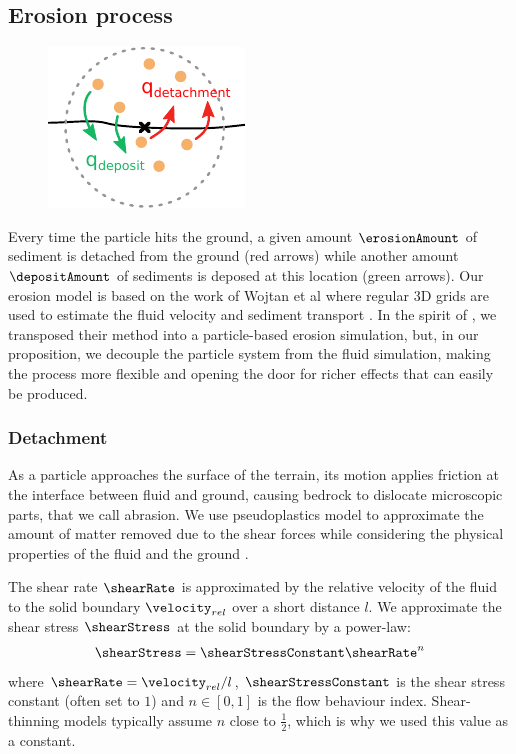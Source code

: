 \subsection{Erosion process}
\begin{figure}
\centering
\includegraphics{erosion_deposition.pdf}

\end{figure}
Every time the particle hits the ground, a given amount $\erosionAmount$ of sediment is detached from the ground (red arrows) while another amount $\depositAmount$ of sediments is deposed at this location (green arrows). Our erosion model is based on the work of Wojtan et al where regular 3D grids are used to estimate the fluid velocity and sediment transport \cite{Wojtan2007}. In the spirit of \cite{Kristof2009}, we transposed their method into a particle-based erosion simulation, but, in our proposition, we decouple the particle system from the fluid simulation, making the process more flexible and opening the door for richer effects that can easily be produced. 

\subsubsection{Detachment}
As a particle approaches the surface of the terrain, its motion applies friction at the interface between fluid and ground, causing bedrock to dislocate microscopic parts, that we call abrasion. We use pseudoplastics model to approximate the amount of matter removed due to the shear forces while considering the physical properties of the fluid and the ground \cite{Wojtan2007}. 

The shear rate $\shearRate$ is approximated by the relative velocity of the fluid to the solid boundary $\velocity_{rel}$ over a short distance $l$.
We approximate the shear stress $\shearStress$ at the solid boundary by a power-law:
\begin{align}\label{eq:erosion_shearStress}
\shearStress = \shearStressConstant \shearRate^n
\end{align}
where $\shearRate = \velocity_{rel}/l$, $\shearStressConstant$ is the shear stress constant (often set to $1$) and $n \in [0,1]$ is the flow behaviour index. Shear-thinning models typically assume $n$ close to $\frac{1}{2}$, which is why we used this value as a constant.  

